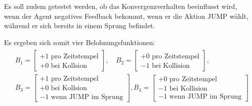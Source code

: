 \par 
Es soll zudem getestet werden, ob das Konvergenzverhalten beeinflusst wird, wenn der Agent negatives Feedback bekommt, wenn er die Aktion JUMP wählt, während er sich bereits in einem Sprung befindet. 
\par
Es ergeben sich somit vier Belohnungsfunktionen:
\begin{multline}
    \begin{aligned}
& B_{1} =  \begin{bmatrix} +1 \text{ pro Zeitstempel}\\  +0 \text{ bei Kollsion} \end{bmatrix}, \quad
B_{2} =  \begin{bmatrix} +0 \text{ pro Zeitstempel} \\ -1 \text{ bei Kollision}   \end{bmatrix}, \\
& B_{3} =  \begin{bmatrix}  +1 \text{ pro Zeitstempel}\\  +0 \text{ bei Kollsion} \\ -1 \text{ wenn JUMP im Sprung}   \end{bmatrix},
B_{4} =  \begin{bmatrix} +0 \text{ pro Zeitstempel} \\ -1 \text{ bei Kollision} \\  -1 \text{ wenn JUMP im Sprung}   \end{bmatrix}
\end{aligned}
\end{multline}